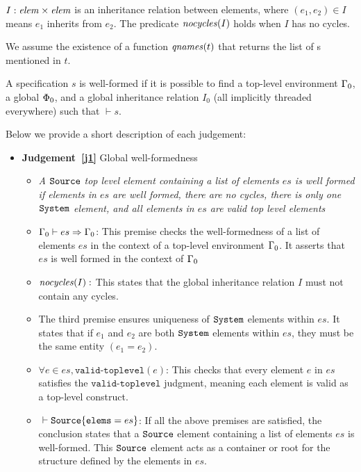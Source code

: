\documentclass{article}
\begin{document}
$I : \mathit{elem} \times \mathit{elem}$ is an inheritance relation between elements, where $(e_1,e_2) \in I$ means
$e_1$ inherits from $e_2$. The predicate $\mathit{nocycles}({I})$ holds when $I$ has no cycles.

We assume the existence of a function $\mathit{qnames}({t})$ that returns the list of s mentioned in  $t$.


\newcommand{\validinh}[2]{\texttt{valid-inherit}({#1},{#2})}
\newcommand{\validclient}[2]{\texttt{valid-client}({#1},{#2})}
\newcommand{\validcontains}[2]{\texttt{valid-contains}({#1},{#2})}
\newcommand{\validtop}[1]{\texttt{valid-toplevel}({#1})}

\newcommand{\wb}[3]{{#1} \vdash {#2} \Rightarrow {#3}}
\newcommand{\wbx}[2]{{#1} \vdash {#2}}

A specification $s$ is well-formed if it is possible to find a top-level environment $\Gamma_0$, a global $\Phi_0$,
and a global inheritance relation $I_0$ (all implicitly threaded everywhere) such that $\wbx{}{s}$.

Below we provide a short description of each judgement:

\begin{itemize}
\item \textbf{Judgement~\ref{j1}} Global well-formedness
\begin{itemize}
\item \textit{A $\texttt{Source}$ top level element containing a list of elements $es$ is well formed if elements in $es$ are well formed, there are no cycles, there is only one $\texttt{System}$ element, and all elements in $es$ are valid top level elements}
\item $\wb{\env_0}{es}{\env_0}$: This premise checks the well-formedness of a list of elements $es$ in the context of a top-level environment $\Gamma_0$. It asserts that $es$ is well formed in the context of $\Gamma_0$
\item $\mathit{nocycles}({I}):$ This states that the global inheritance relation $I$ must not contain any cycles.
\item The third premise ensures uniqueness of $\texttt{System}$ elements within $es$. It states that if $e_1$ and $e_2$ are both $\texttt{System}$ elements within $es$, they must be the same entity $(e_1 = e_2)$.
\item $\forall e \in es, \validtop{e}$: This checks that every element $e$ in $es$ satisfies the $\texttt{valid-toplevel}$ judgment, meaning each element is valid as a top-level construct.
\item $\wbx{}{\lab{Source}\{\lab{elems}=es\}}$: If all the above premises are satisfied, the conclusion states that a $\texttt{Source}$ element containing a list of elements $es$ is well-formed. This $\texttt{Source}$ element acts as a container or root for the structure defined by the elements in $es$.
\end{itemize}
\end{itemize}
\end{document}
